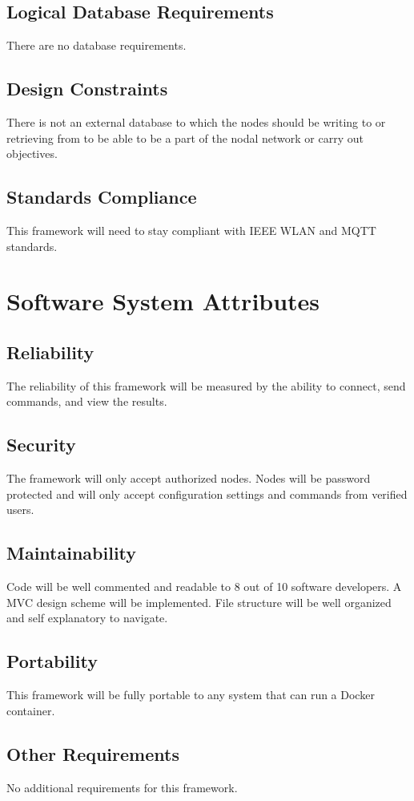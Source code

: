 \documentclass[draftclsnofoot, onecolumn, compsoc, 10pt]{IEEEtran}
\begin{document}
\subsection{Logical Database Requirements}
There are no database requirements. 

\subsection{Design Constraints}
There is not an external database to which the nodes should be writing to or retrieving from to be able to be a part of the nodal network or carry out objectives.

\subsection{Standards Compliance}
This framework will need to stay compliant with IEEE WLAN and MQTT standards.

\section{Software System Attributes}
\subsection{Reliability}
The reliability of this framework will be measured by the ability to connect, send commands, and view the results.

\subsection{Security}
The framework will only accept authorized nodes. Nodes will be password protected and will only accept configuration settings and commands from verified users.

\subsection{Maintainability}
Code will be well commented and readable to 8 out of 10 software developers. A MVC design scheme will be implemented. File structure will be well organized and self explanatory to navigate.


\subsection{Portability}
This framework will be fully portable to any system that can run a Docker container. 

\subsection{Other Requirements}
No additional requirements for this framework.
\end{document}
